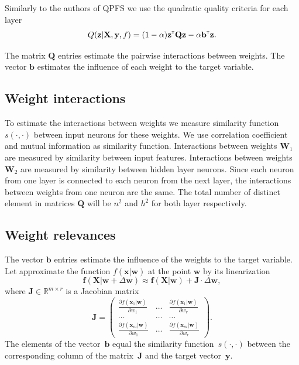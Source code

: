 \documentclass[a4paper,12pt]{article}
\theoremstyle{plain} %
\theoremstyle{definition} %
\theoremstyle{remark} %
\newcommand{\bb}{\mathbf{b}}
\newcommand{\bw}{\mathbf{w}}
\newcommand{\by}{\mathbf{y}}
\newcommand{\bx}{\mathbf{x}}
\newcommand{\bz}{\mathbf{z}}
\newcommand{\bQ}{\mathbf{Q}}
\newcommand{\bbR}{\mathbb{R}}
\newcommand{\bW}{\mathbf{W}}
\newcommand{\bX}{\mathbf{X}}
\newcommand{\T}{{\text{\tiny\sffamily\upshape\mdseries T}}}
\begin{document}
	Similarly to the authors of QPFS we use the quadratic quality criteria for each layer
	\begin{equation}
		Q(\bz | \bX, \by, f) = (1 - \alpha) \bz^{\T} \bQ\bz - \alpha \mathbf{b}^{\T} \bz.
	\end{equation}
	
	The matrix $\bQ$ entries estimate the pairwise interactions between weights. The vector $\bb$ estimates the influence of each weight to the target variable.
	
	\subsection*{Weight interactions}
	To estimate the interactions between weights we measure similarity function $s(\cdot, \cdot)$ between input neurons for these weights. 
	We use correlation coefficient and mutual information as similarity function.
	Interactions between weights $\bW_1$ are measured by similarity between input features. 
	Interactions between weights $\bW_2$ are measured by similarity between hidden layer neurons.
	Since each neuron from one layer is connected to each neuron from the next layer, the interactions between weights from one neuron are the same.
	The total number of distinct element in matrices $\bQ$ will be $n^2$ and $h^2$ for both layer respectively.
	
	\subsection*{Weight relevances}
	
	The vector $\bb$ entries estimate the influence of the weights to the target variable. Let approximate the function $f(\bx | \bw)$ at the point $\bw$ by its linearization
	\begin{equation}
		\mathbf{f} (\bX | \bw + \Delta \bw) \approx \mathbf{f}(\bX | \bw) + \mathbf{J} \cdot \Delta \bw,
	\end{equation}
	where $\mathbf{J} \in \bbR^{m \times r}$ is a Jacobian matrix
	\begin{equation}
		\mathbf{J} = 
		\begin{pmatrix}
			\frac{\partial f(\bx_1 | \bw)}{\partial w_1} & \dots & 
			\frac{\partial f(\bx_1 | \bw)}{\partial w_r} \\
			\dots & \dots & \dots \\
			\frac{\partial f(\bx_m | \bw)}{\partial w_1} & \dots & 
			\frac{\partial f(\bx_m | \bw)}{\partial w_r}
		\end{pmatrix}.
	\end{equation}
	The elements of the vector~$\bb$ equal the similarity function~$s(\cdot, \cdot)$ between the corresponding column of the matrix~$\mathbf{J}$ and the target vector~$\by$.
	
\end{document}
